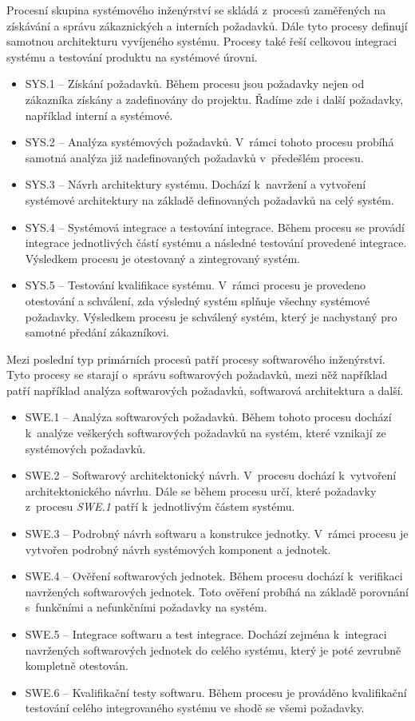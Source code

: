 \documentclass[czech,master]{diploma}
\begin{document}
Procesní skupina systémového inženýrství se skládá z~procesů zaměřených na získávání a správu zákaznických a interních požadavků. Dále tyto procesy definují samotnou architekturu vyvíjeného systému. Procesy také řeší celkovou integraci systému a testování produktu na systémové úrovni.

\begin{itemize}
\item SYS.1 -- Získání požadavků. Během procesu jsou požadavky nejen od zákazníka získány a zadefinovány do projektu. Řadíme zde i další požadavky, například interní a systémové.
\item SYS.2 -- Analýza systémových požadavků. V~rámci tohoto procesu probíhá samotná analýza již nadefinovaných požadavků v~předešlém procesu.
\item SYS.3 -- Návrh architektury systému. Dochází k~navržení a vytvoření systémové architektury na základě definovaných požadavků na celý systém.
\item SYS.4 -- Systémová integrace a testování integrace. Během procesu se provádí integrace jednotlivých částí systému a následné testování provedené integrace. Výsledkem procesu je otestovaný a zintegrovaný systém.
\item SYS.5 -- Testování kvalifikace systému. V~rámci procesu je provedeno otestování a schválení, zda výsledný systém splňuje všechny systémové požadavky. Výsledkem procesu je schválený systém, který je nachystaný pro samotné předání zákazníkovi.
\end{itemize}

Mezi poslední typ primárních procesů patří procesy softwarového inženýrství. Tyto procesy se starají o~správu softwarových požadavků, mezi něž například patří například analýza softwarových požadavků, softwarová architektura a další.

\begin{itemize}
\item SWE.1 -- Analýza softwarových požadavků. Během tohoto procesu dochází k~analýze veškerých softwarových požadavků na systém, které vznikají ze systémových požadavků.
\item SWE.2 -- Softwarový architektonický návrh. V~procesu dochází k~vytvoření architektonického návrhu. Dále se během procesu určí, které požadavky z~procesu \textit{SWE.1} patří k~jednotlivým částem systému.
\item SWE.3 -- Podrobný návrh softwaru a konstrukce jednotky. V~rámci procesu je vytvořen podrobný návrh systémových komponent a jednotek.
\item SWE.4 -- Ověření softwarových jednotek. Během procesu dochází k~verifikaci navržených softwarových jednotek. Toto ověření probíhá na základě porovnání s~funkčními a nefunkčními požadavky na systém.
\item SWE.5 -- Integrace softwaru a test integrace. Dochází zejména k~integraci navržených softwarových jednotek do celého systému, který je poté zevrubně kompletně otestován.
\item SWE.6 -- Kvalifikační testy softwaru. Během procesu je prováděno kvalifikační testování celého integrovaného systému ve shodě se všemi požadavky.
\end{itemize}
\end{document}
